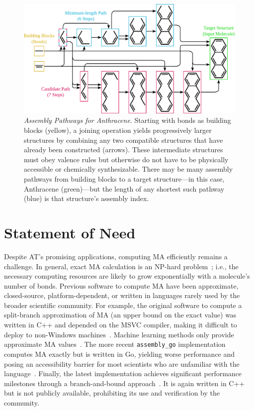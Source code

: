 \documentclass[acmsmall,nonacm,screen]{acmart}  %
\begin{document}
\begin{figure}[tbh]
    \centering
    \includegraphics[width=\textwidth]{anthracene.pdf}
    \caption{\textit{Assembly Pathways for Anthracene}.
    Starting with bonds as building blocks (yellow), a joining operation yields progressively larger structures by combining any two compatible structures that have already been constructed (arrows).
    These intermediate structures must obey valence rules but otherwise do not have to be physically accessible or chemically synthesizable.
    There may be many assembly pathways from building blocks to a target structure---in this case, Anthracene (green)---but the length of any shortest such pathway (blue) is that structure's assembly index.}
    \label{fig:assemblyindex}
\end{figure}




\section{Statement of Need} \label{sec:statementofneed}

Despite AT's promising applications, computing MA efficiently remains a challenge.
In general, exact MA calculation is an NP-hard problem~\cite{Kempes2024-assemblytheory}; i.e., the necessary computing resources are likely to grow exponentially with a molecule's number of bonds.
Previous software to compute MA have been approximate, closed-source, platform-dependent, or written in languages rarely used by the broader scientific community.
For example, the original software to compute a split-branch approximation of MA (an upper bound on the exact value) was written in C++ and depended on the MSVC compiler, making it difficult to deploy to non-Windows machines~\cite{Marshall2021-identifyingmolecules}.
Machine learning methods only provide approximate MA values~\cite{Gebhard2022-inferringmolecular}.
The more recent \texttt{assembly\_go} implementation computes MA exactly but is written in Go, yielding worse performance and posing an accessibility barrier for most scientists who are unfamiliar with the language~\cite{Jirasek2024-investigatingquantifying}.
Finally, the latest implementation achieves significant performance milestones through a branch-and-bound approach~\cite{Seet2024-rapidcomputation}.
It is again written in C++ but is not publicly available, prohibiting its use and verification by the community.
\end{document}
